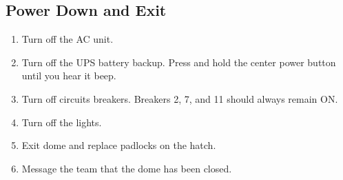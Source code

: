 \documentclass{article}
\begin{document}
	\subsection{Power Down and Exit}

		\begin{enumerate}

			\item Turn off the AC unit.

			\item Turn off the UPS battery backup. Press and hold the center power button until you hear it beep.

			\item Turn off circuits breakers. Breakers 2, 7, and 11 should always remain ON.

			\item Turn off the lights.

			\item Exit dome and replace padlocks on the hatch.

			\item Message the team that the dome has been closed.

		\end{enumerate}
\end{document}
